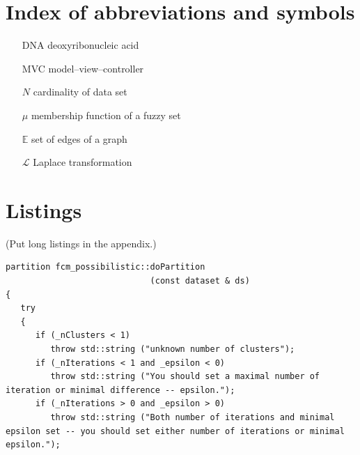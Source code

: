 \documentclass[a4paper,twoside,12pt]{book}
\newcounter{PagesWithoutNumbers}
\begin{document}
 

 


\backmatter
{}
\setcounter{page}{\value{PagesWithoutNumbers}}

\pagestyle{onlyPageNumbers}

\printbibliography           %


\begin{appendices} 


 

\chapter*{Index of abbreviations and symbols}

\begin{itemize}
\item[DNA] deoxyribonucleic acid
\item[MVC] model--view--controller 
\item[$N$] cardinality of data set
\item[$\mu$] membership function of a fuzzy set
\item[$\mathbb{E}$] set of edges of a graph
\item[$\mathcal{L}$] Laplace transformation
\end{itemize}


\chapter*{Listings}

(Put long listings in the appendix.)

\begin{lstlisting}
partition fcm_possibilistic::doPartition
                             (const dataset & ds)
{
   try
   {
      if (_nClusters < 1)
         throw std::string ("unknown number of clusters");
      if (_nIterations < 1 and _epsilon < 0)
         throw std::string ("You should set a maximal number of iteration or minimal difference -- epsilon.");
      if (_nIterations > 0 and _epsilon > 0)
         throw std::string ("Both number of iterations and minimal epsilon set -- you should set either number of iterations or minimal epsilon.");
   

\end{lstlisting}
\end{appendices}
\end{document}
